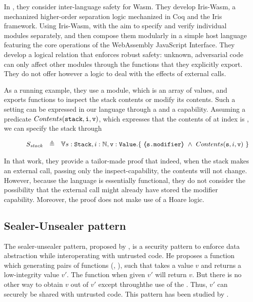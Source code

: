 %
In \cite{irisWasm23}, they consider inter-language safety for Wasm. They develop Iris-Wasm, a mechanized higher-order separation logic mechanized in Coq and the Iris framework. Using Iris-Wasm, with the aim to
specify and verify individual modules separately, and then compose them modularly in a simple host language
featuring the core operations of the WebAssembly JavaScript Interface. They develop a 
logical relation that enforces robust safety: unknown, adversarial code can only aﬀect other modules through
the functions that they explicitly export. 
They do not offer however a logic to deal with the effects of external calls.

As a running example, they use a  module, which is an array of values, and exports functions to inspect the stack contents or modify its contents. 
Such a setting can be expressed in our language through a  and a  capability.
Assuming a predicate $Contents(\mbox{\normalfont{\texttt{stack}}},\mbox{\normalfont{\texttt{i}}},\mbox{\normalfont{\texttt{v}}})$, which expresses that the contents of  at index  is , we can specify the stack through
 
 $$\strut \SPSP  S_{stack}\ \  \triangleq \ \ \TwoStatesN{ s:\prg{Stack},i:\mathbb{N},\prg{v}:\prg{Value}} 
 {\ \inside{\prg{s.modifier}} \ \wedge \ Contents(\prg{s},i,\prg{v})\  }$$  
 
 
 
 In that work, they provide a tailor-made proof that indeed, when the stack makes an external call, passing only the inspect-capability, the contents will not change. 
 However, because the language is essentially functional, they do not consider the possibility that the external call might already have stored the modifier capability.
 Moreover, the proof does not make use of a Hoare logic.  
 
 \subsection{Sealer-Unsealer pattern} 
 The sealer-unsealer pattern, proposed by \citet{JamesMorris}, is a security  pattern  to enforce data
abstraction while interoperating with untrusted  code. He proposes a function
 which generating pairs of functions (,  ), such that  takes a value $v$ and returns a low-integrity value $v'$.
The function  when given $v'$ will return $v$. But there is no other way to obtain $v$ out of $v'$ except throughthe use of the .
Thus, $v'$ can securely be shared with untrusted code.
This pattern has been studied by \citet{ddd}.

